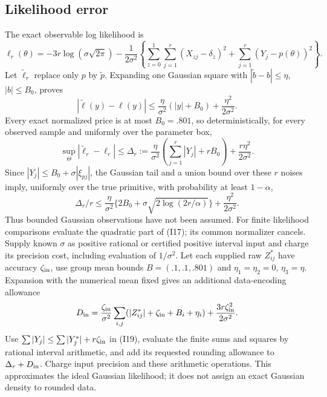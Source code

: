 \documentclass[11pt,a4paper]{article}
\begin{document}
\subsection{Likelihood error}
The exact observable log likelihood is
\[
 \ell_r(\theta)=-3r\log(\sigma\sqrt{2\pi})-
 \frac1{2\sigma^2}\left\{\sum_{z=0}^1\sum_{j=1}^r(X_{zj}-\delta_z)^2
                         +\sum_{j=1}^r(Y_j-p(\theta))^2\right\}. \tag{I17}
\]
Let $\widetilde\ell_r$ replace only $p$ by $\widetilde p$. Expanding one
Gaussian square with $|\widetilde b-b|\leq\eta$, $|b|\leq B_0$, proves
\[
 |\widetilde\ell(y)-\ell(y)|\leq
 \frac\eta{\sigma^2}(|y|+B_0)+\frac{\eta^2}{2\sigma^2}.       \tag{I18}
\]
Every exact normalized price is at most $B_0=.801$, so deterministically,
for every observed sample and uniformly over the parameter box,
\[
 \sup_{\Theta}|\widetilde\ell_r-\ell_r|\leq\Delta_r
 :=\frac\eta{\sigma^2}\left(\sum_{j=1}^r|Y_j|+rB_0\right)
                       +\frac{r\eta^2}{2\sigma^2}.          \tag{I19}
\]
Since $|Y_j|\leq B_0+\sigma|\xi_{pj}|$, the Gaussian tail and a union bound
over these $r$ noises imply, uniformly over the true primitive, with probability
at least $1-\alpha$,
\[
 \Delta_r/r\leq\frac\eta{\sigma^2}
       \{2B_0+\sigma\sqrt{2\log(2r/\alpha)}\}
                         +\frac{\eta^2}{2\sigma^2}.         \tag{I20}
\]
Thus bounded Gaussian observations have not been assumed. For finite likelihood
comparisons evaluate the quadratic part of \textup{(I17)}; its common normalizer
cancels. Supply known $\sigma$ as positive rational or certified positive interval
input and charge its precision cost, including evaluation of $1/\sigma^2$.
Let each supplied raw $Z^*_{ij}$ have accuracy
$\zeta_{\rm in}$, use group mean bounds $B=(.1,.1,.801)$ and
$\eta_1=\eta_2=0$, $\eta_3=\eta$. Expansion with the numerical mean fixed gives
an additional data-encoding allowance
\[
 D_{\rm in}=\frac{\zeta_{\rm in}}{\sigma^2}
 \sum_{i,j}(|Z^*_{ij}|+\zeta_{\rm in}+B_i+\eta_i)
                         +\frac{3r\zeta_{\rm in}^2}{2\sigma^2}.
\]
Use $\sum|Y_j|\leq\sum|Y_j^*|+r\zeta_{\rm in}$ in \textup{(I19)}, evaluate
the finite sums and squares by rational interval arithmetic, and add its
requested rounding allowance to $\Delta_r+D_{\rm in}$. Charge input precision
and these arithmetic operations. This approximates the ideal Gaussian
likelihood; it does not assign an exact Gaussian density to rounded data.
\end{document}
